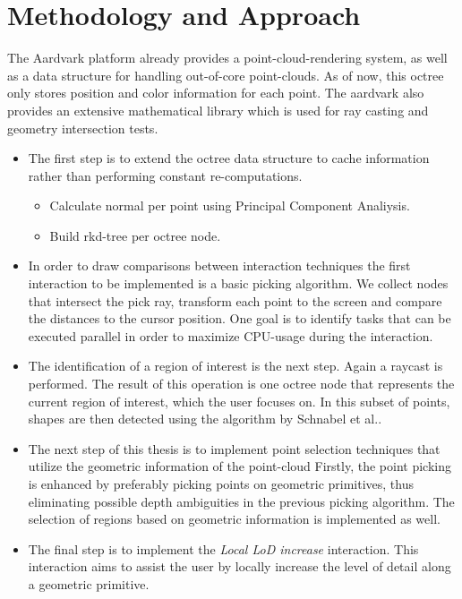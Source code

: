 \section{Methodology and Approach}

The Aardvark platform already provides a point-cloud-rendering system, as well as a data structure for handling out-of-core point-clouds. As of now, this octree only stores position and color information for each point. The aardvark also provides an extensive mathematical library which is used for ray casting and geometry intersection tests. 
\\
\begin{itemize}
\item 
The first step is to extend the octree data structure to cache information rather than performing constant re-computations. 
\begin{itemize}
	\item Calculate normal per point using Principal Component Analiysis\cite{jolliffe2002principal}.
	\item Build rkd-tree\cite{tobler2011rkd} per octree node.
\end{itemize}
\item 
In order to draw comparisons between interaction techniques the first interaction to be implemented is a basic picking algorithm. We collect nodes that intersect the pick ray, transform each point to the screen and compare the distances to the cursor position. One goal is to identify tasks that can be executed parallel in order to maximize CPU-usage during the interaction. 
\item 
The identification of a region of interest is the next step. Again a raycast is performed. The result of this operation is one octree node that represents the current region of interest, which the user focuses on. In this subset of points, shapes are then detected using the algorithm by Schnabel et al.\cite{schnabel-2007-efficient}.
\item
The next step of this thesis is to implement point selection techniques that utilize the geometric information of the point-cloud
Firstly, the point picking is enhanced by preferably picking points on geometric primitives, thus eliminating possible depth ambiguities in the previous picking algorithm. 
The selection of regions based on geometric information is implemented as well.
\item
The final step is to implement the \textit{Local LoD increase} interaction. This interaction aims to assist the user by locally increase the level of detail along a geometric primitive. 

\end{itemize}